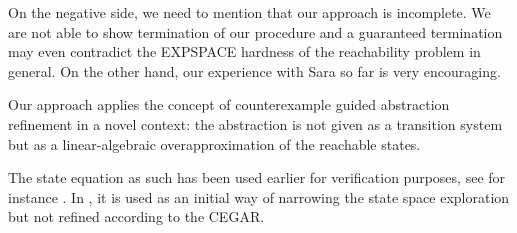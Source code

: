 \documentclass{LMCS}
\begin{document}
On the negative side, we need to mention that our approach is incomplete. We are not able to show termination of our procedure
and a guaranteed termination may even contradict the EXPSPACE hardness of the reachability problem in general. On the
other hand, our experience with Sara so far is very encouraging.

Our approach applies the concept of counterexample guided abstraction refinement in a novel context: the
abstraction is not given as a transition system but as a linear-algebraic overapproximation of the reachable states.

The state equation as such has been used earlier for verification purposes, see for instance \cite{melzer00}.
In \cite{narrowing}, it is used as an initial way of narrowing the state space exploration but not refined
according to the CEGAR.



\end{document}

